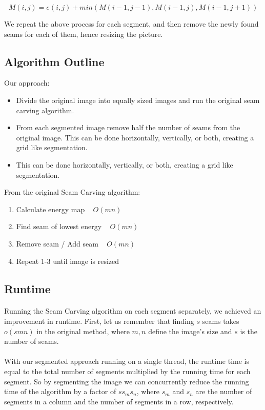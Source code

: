 \documentclass[conference]{acmsiggraph}
\begin{document}
\begin{equation}
M(i,j) = e(i,j) + min( M(i-1,j-1), M(i-1,j), M(i-1,j+1) )
\end{equation}

We repeat the above process for each segment, and then remove the newly found seams for each of them, hence resizing the picture.

\subsection{Algorithm Outline}
Our approach:

\begin{itemize}
  \item Divide the original image into equally sized images and run the original seam carving algorithm.
  \item From each segmented image remove half the number of seams from the original image. This can be done horizontally, vertically, or both, creating a grid like segmentation.
  \item This can be done horizontally, vertically, or both, creating a grid like segmentation.
\end{itemize}

From the original Seam Carving algorithm:
\begin{enumerate}
  \item Calculate energy map ~ $O(m n)$
  \item Find seam of lowest energy ~ $O(m n)$
  \item Remove seam / Add seam ~ $O(m n)$
  \item Repeat 1-3 until image is resized
\end{enumerate}


\subsection{Runtime}

\paragraph{}
Running the Seam Carving algorithm on each segment separately, we achieved an improvement in runtime. First, let us remember that finding $s$ seams takes $o(s m n)$ in the original method, where $m,n$ define the image's size and $s$ is the number of seams.

\paragraph{}
With our segmented approach running on a single thread, the runtime time is equal to the total number of segments multiplied by the running time for each segment. So by segmenting the image we can concurrently reduce the running time of the algorithm by a factor of $s s_m s_n$, where $s_m$ and $s_n$ are the number of segments in a column and the number of segments in a row, respectively. 
\end{document}

